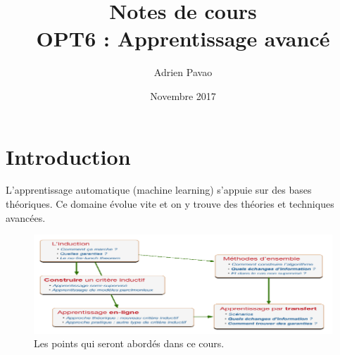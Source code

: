 \documentclass{article}
\title{Notes de cours\\OPT6 : Apprentissage avancé}
\author{Adrien Pavao}
\date{Novembre 2017}
\begin{document}
\maketitle


\section{Introduction}

L'apprentissage automatique (machine learning) s'appuie sur des bases théoriques. Ce domaine évolue vite et on y trouve des théories et techniques avancées.

\begin{figure}[H]
  \centering
  \includegraphics[scale=0.4]{outline.png}
  \caption{Les points qui seront abordés dans ce cours.}
\end{figure}
\end{document}
